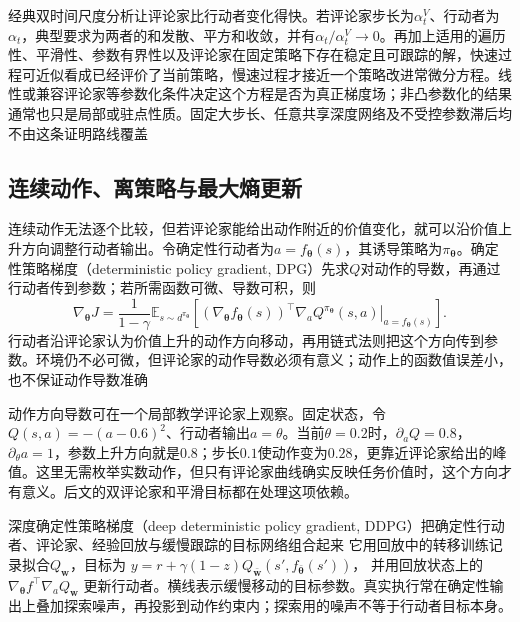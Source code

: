 经典双时间尺度分析让评论家比行动者变化得快。若评论家步长为$\alpha_t^V$、行动者为$\alpha_t$，典型要求为两者的和发散、平方和收敛，并有$\alpha_t/\alpha_t^V\to0$。再加上适用的遍历性、平滑性、参数有界性以及评论家在固定策略下存在稳定且可跟踪的解，快速过程可近似看成已经评价了当前策略，慢速过程才接近一个策略改进常微分方程。线性或兼容评论家等参数化条件决定这个方程是否为真正梯度场；非凸参数化的结果通常也只是局部或驻点性质。固定大步长、任意共享深度网络及不受控参数滞后均不由这条证明路线覆盖

\subsection{连续动作、离策略与最大熵更新}
\label{sec:rl-learning-continuous-soft}

连续动作无法逐个比较，但若评论家能给出动作附近的价值变化，就可以沿价值上升方向调整行动者输出。令确定性行动者为$a=f_{\bm\theta}(s)$，其诱导策略为$\pi_{\bm\theta}$。确定性策略梯度（deterministic policy gradient, DPG）先求$Q$对动作的导数，再通过行动者传到参数；若所需函数可微、导数可积，则
\begin{equation}
  \nabla_{\bm\theta}J
    =\frac1{1-\gamma}
       \mathbb E_{s\sim d^{\pi_{\bm\theta}}}
       \left[
         (\nabla_{\bm\theta}f_{\bm\theta}(s))^\top
         \left.\nabla_a Q^{\pi_{\bm\theta}}(s,a)
                    \right|_{a=f_{\bm\theta}(s)}
       \right].
  \label{eq:rl-learning-dpg}
\end{equation}
行动者沿评论家认为价值上升的动作方向移动，再用链式法则把这个方向传到参数。环境仍不必可微，但评论家的动作导数必须有意义；动作上的函数值误差小，也不保证动作导数准确

动作方向导数可在一个局部教学评论家上观察。固定状态，令$Q(s,a)=-(a-0.6)^2$、行动者输出$a=\theta$。当前$\theta=0.2$时，$\partial_aQ=0.8$，$\partial_\theta a=1$，参数上升方向就是$0.8$；步长$0.1$使动作变为$0.28$，更靠近评论家给出的峰值。这里无需枚举实数动作，但只有评论家曲线确实反映任务价值时，这个方向才有意义。后文的双评论家和平滑目标都在处理这项依赖。

深度确定性策略梯度（deep deterministic policy gradient, DDPG）把确定性行动者、评论家、经验回放与缓慢跟踪的目标网络组合起来
它用回放中的转移训练记录拟合$Q_{\bm w}$，目标为
$y=r+\gamma(1-z)Q_{\bar{\bm w}}(s',f_{\bar{\bm\theta}}(s'))$，
并用回放状态上的
$\nabla_{\bm\theta}f^\top\nabla_a Q_{\bm w}$
更新行动者。横线表示缓慢移动的目标参数。真实执行常在确定性输出上叠加探索噪声，再投影到动作约束内；探索用的噪声不等于行动者目标本身。

